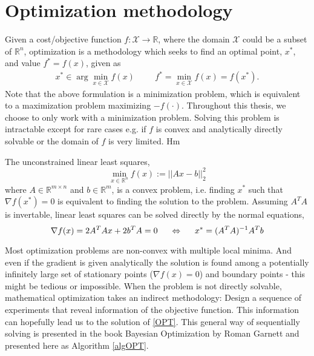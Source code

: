 \chapter{Optimization methodology}
Given a cost/objective function $f: \mathcal{X} \rightarrow \mathbb{R}$, where the domain
$\mathcal{X}$ could be a subset of $\mathbb{R}^n$,
optimization is a methodology which seeks to find an optimal point, $x^*$, and value
$f^* = f(x)$, given as
\begin{align}\label{OPT}
    x^* \in \arg\min_{x \in \mathcal{X}} f(x) \hspace{1cm} f^* = \min_{x \in \mathcal{X}} f(x) = f(x^*).
\end{align}
Note that the above formulation is a minimization problem, which is equivalent to a
maximization problem maximizing $-f(\cdot)$. Throughout this thesis, we choose to only work
with a minimization problem. 
Solving this problem is intractable except for rare cases e.g. if $f$ is 
convex and analytically directly solvable or the domain of $f$ is very limited. Hm

\begin{testexample}
    The unconstrained linear least squares, $$\min_{x\in \mathbb{R}^n} f(x) := ||Ax-b||_2^2$$
    where $A \in \mathbb{R}^{m\times n}$ and $b \in \mathbb{R}^m$, is a convex problem,
    i.e. finding $x^*$ such that $\nabla f(x^*) = 0$ is equivalent to finding the solution
    to the problem. Assuming $A^TA$ is invertable, linear least squares can be solved
    directly by the normal equations, 
    $$\nabla f(x) = 2A^TAx + 2b^TA = 0 \hspace{0.5cm} \Leftrightarrow \hspace{0.5cm} x^* = (A^TA)^{-1} A^Tb$$
\end{testexample}

Most optimization problems are non-convex with multiple local minima. And even if the gradient is
given analytically the solution is found among a potentially infinitely large 
set of stationary points ($\nabla f(x) = 0$) and boundary points - this might be tedious or impossible.
When the problem is not directly solvable, mathematical optimization takes an indirect methodology: 
Design a sequence of experiments that reveal information of the objective function. This information 
can hopefully lead us to the solution of \eqref{OPT}. This general way of sequentially solving 
is presented in the book Bayesian Optimization by Roman Garnett \cite{bayesoptbook} and 
presented here as Algorithm \ref{algOPT}. 

